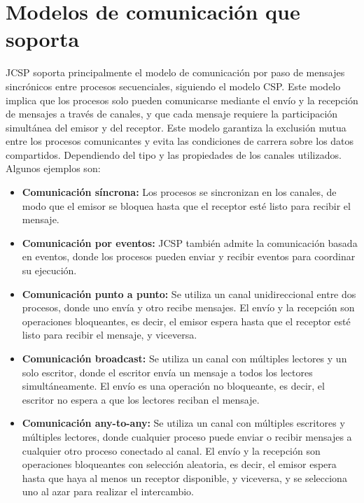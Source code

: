 \section*{Modelos de comunicación que soporta}
JCSP soporta principalmente el modelo de comunicación por paso de mensajes sincrónicos entre procesos secuenciales, siguiendo el modelo CSP. Este modelo implica que los procesos solo pueden comunicarse mediante el envío y la recepción de mensajes a través de canales, y que cada mensaje requiere la participación simultánea del emisor y del receptor. Este modelo garantiza la exclusión mutua entre los procesos comunicantes y evita las condiciones de carrera sobre los datos compartidos. Dependiendo del tipo y las propiedades de los canales utilizados. Algunos ejemplos son:

\begin{itemize}
	\item\textbf{Comunicación síncrona:} Los procesos se sincronizan en los canales, de modo que el emisor se bloquea hasta que el receptor esté listo para recibir el mensaje.
	
	\item\textbf{Comunicación por eventos:} JCSP también admite la comunicación basada en eventos, donde los procesos pueden enviar y recibir eventos para coordinar su ejecución.
	
	\item\textbf{Comunicación punto a punto:} Se utiliza un canal unidireccional entre dos procesos, donde uno envía y otro recibe mensajes. El envío y la recepción son operaciones bloqueantes, es decir, el emisor espera hasta que el receptor esté listo para recibir el mensaje, y viceversa.
	
	\item\textbf{Comunicación broadcast:} Se utiliza un canal con múltiples lectores y un solo escritor, donde el escritor envía un mensaje a todos los lectores simultáneamente. El envío es una operación no bloqueante, es decir, el escritor no espera a que los lectores reciban el mensaje.
	
	\item\textbf{Comunicación any-to-any:} Se utiliza un canal con múltiples escritores y múltiples lectores, donde cualquier proceso puede enviar o recibir mensajes a cualquier otro proceso conectado al canal. El envío y la recepción son operaciones bloqueantes con selección aleatoria, es decir, el emisor espera hasta que haya al menos un receptor disponible, y viceversa, y se selecciona uno al azar para realizar el intercambio.
	

\end{itemize}
